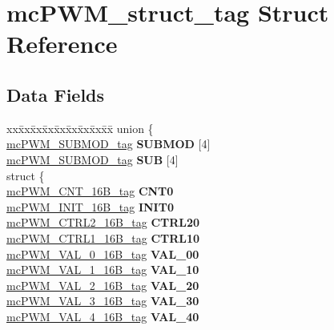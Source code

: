 \hypertarget{structmcPWM__struct__tag}{}\section{mc\+P\+W\+M\+\_\+struct\+\_\+tag Struct Reference}
\label{structmcPWM__struct__tag}
\subsection*{Data Fields}
\begin{DoxyCompactItemize}
\item 
\mbox{\label{structmcPWM__struct__tag_a03fd523a676a45ed3010812ded132e5d}} 
\begin{tabbing}
xx\=xx\=xx\=xx\=xx\=xx\=xx\=xx\=xx\=\kill
union \{\\
\>\mbox{\hyperlink{structmcPWM__SUBMOD__struct__tag}{mcPWM\_SUBMOD\_tag}} {\bfseries SUBMOD} \mbox{[}4\mbox{]}\\
\>\mbox{\hyperlink{structmcPWM__SUBMOD__struct__tag}{mcPWM\_SUBMOD\_tag}} {\bfseries SUB} \mbox{[}4\mbox{]}\\
\mbox{\label{unionmcPWM__struct__tag_1_1_0D1992_a6711ea607c3d50cc71cca702de4c00a4}} 
\>struct \{\\
\>\>\mbox{\hyperlink{unionmcPWM__CNT__16B__tag}{mcPWM\_CNT\_16B\_tag}} {\bfseries CNT0}\\
\>\>\mbox{\hyperlink{unionmcPWM__INIT__16B__tag}{mcPWM\_INIT\_16B\_tag}} {\bfseries INIT0}\\
\>\>\mbox{\hyperlink{unionmcPWM__CTRL2__16B__tag}{mcPWM\_CTRL2\_16B\_tag}} {\bfseries CTRL20}\\
\>\>\mbox{\hyperlink{unionmcPWM__CTRL1__16B__tag}{mcPWM\_CTRL1\_16B\_tag}} {\bfseries CTRL10}\\
\>\>\mbox{\hyperlink{unionmcPWM__VAL__0__16B__tag}{mcPWM\_VAL\_0\_16B\_tag}} {\bfseries VAL\_00}\\
\>\>\mbox{\hyperlink{unionmcPWM__VAL__1__16B__tag}{mcPWM\_VAL\_1\_16B\_tag}} {\bfseries VAL\_10}\\
\>\>\mbox{\hyperlink{unionmcPWM__VAL__2__16B__tag}{mcPWM\_VAL\_2\_16B\_tag}} {\bfseries VAL\_20}\\
\>\>\mbox{\hyperlink{unionmcPWM__VAL__3__16B__tag}{mcPWM\_VAL\_3\_16B\_tag}} {\bfseries VAL\_30}\\
\>\>\mbox{\hyperlink{unionmcPWM__VAL__4__16B__tag}{mcPWM\_VAL\_4\_16B\_tag}} {\bfseries VAL\_40}\\

\end{tabbing}
\end{DoxyCompactItemize}
